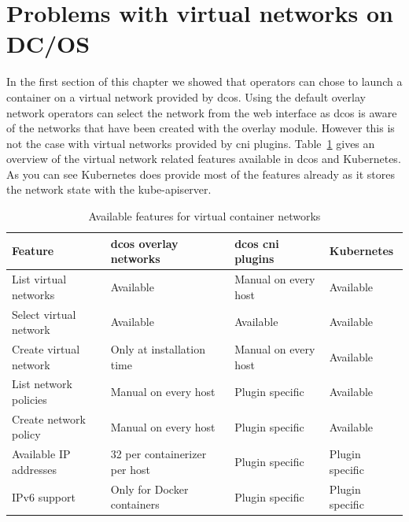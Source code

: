 \section{Problems with virtual networks on DC/OS}
\label{sec:problems}
In the first section of this chapter we showed that operators can chose to launch a container on a virtual network provided by \gls{dcos}. Using the default overlay network operators can select the network from the web interface as \gls{dcos} is aware of the networks that have been created with the overlay module. However this is not the case with virtual networks provided by \gls{cni} plugins. Table~\ref{tab:problems} gives an overview of the virtual network related features available in \gls{dcos} and Kubernetes. As you can see Kubernetes does provide most of the features already as it stores the network state with the kube-apiserver.

\begin{table}[ht]
\centering
\begin{tabular}{l l l l} 
 \textbf{Feature} & \textbf{\gls{dcos} overlay networks} & \textbf{\gls{dcos} \gls{cni} plugins} & \textbf{Kubernetes} \\
 \hline\hline
 List virtual networks & Available & Manual on every host & Available \\
 Select virtual network & Available & Available & Available \\
 Create virtual network & Only at installation time & Manual on every host & Available \\
 List network policies & Manual on every host & Plugin specific  & Available \\
 Create network policy & Manual on every host & Plugin specific & Available \\
 Available IP addresses & 32 per containerizer per host & Plugin specific & Plugin specific \\
 IPv6 support & Only for Docker containers & Plugin specific & Plugin specific \\
 \hline
\end{tabular}
\caption{Available features for virtual container networks}
\label{tab:problems}
\end{table}
